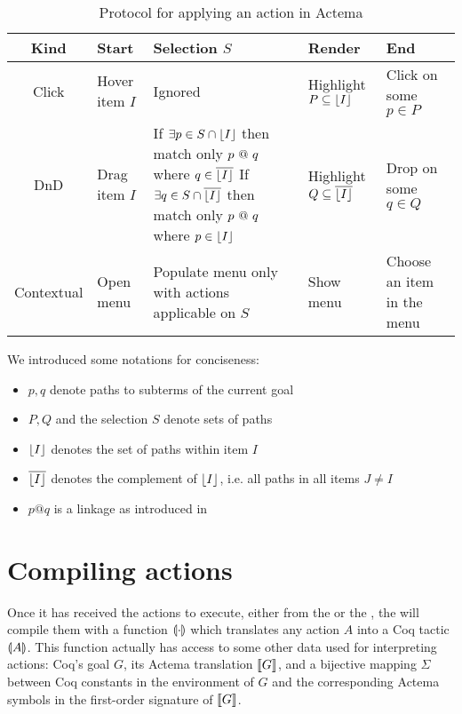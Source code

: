 \begin{table*}[]
  \def\arraystretch{1.5}
  \begin{tabular}{|c|C{0.2\textwidth}|C{0.4\textwidth}|C{0.25\textwidth}|C{0.2\textwidth}|}
  \hline
  \textbf{Kind} & \textbf{Start}       & \textbf{Selection $S$} &
  \textbf{Render}                      & \textbf{End} \\ \hline
  Click         & Hover item $I$       & Ignored & Highlight $P \subseteq
  \lfloor I \rfloor$ & Click on some $p \in P$    \\ \hline
  DnD           & Drag item $I$        &
      If $\exists p \in S \cap \lfloor I \rfloor$ then match only $p \operatorname{\,@\,} q$ where
      $q \in \overline{\lfloor I \rfloor}$
      \newline
      If $\exists q \in S \cap \overline{\lfloor I \rfloor}$ then match only $p
      \operatorname{\,@\,} q$ where $p \in \lfloor I \rfloor$
    & Highlight $Q \subseteq \overline{\lfloor I \rfloor}$ & Drop on some $q \in Q$ \\ \hline
  Contextual    & Open menu & Populate menu only with actions
  applicable on $S$ & Show menu & Choose an item in the menu \\ \hline
  \end{tabular}
  \raggedright
  \parbox{\textwidth}{
    \vspace{1.5em}
    We introduced some notations for conciseness:
    \begin{itemize}
      \item $p, q$ denote paths to subterms of the current goal
      \item $P, Q$ and the selection $S$ denote sets of paths
      \item $\lfloor I \rfloor$ denotes the set of paths within item $I$
      \item $\overline{\lfloor I \rfloor}$ denotes the complement of $\lfloor I \rfloor$, i.e.
      all paths in all items $J \not= I$
      \item $p @ q$ is a linkage as introduced in 
    \end{itemize}}

  \caption{Protocol for applying an action in Actema}
\end{table*}


\section{Compiling actions}

Once it has received the actions to execute, either from the 
or the , the  will compile them with a function
$\llparenthesis \cdot \rrparenthesis$ which translates any action $A$ into a Coq tactic
$\llparenthesis A \rrparenthesis$. This function actually has access to some other data used for
interpreting actions: Coq's goal $G$, its Actema translation $\llbracket G \rrbracket$, and a
bijective mapping $\Sigma$ between Coq constants in the environment of $G$ and
the corresponding Actema symbols in the first-order signature of $\llbracket G \rrbracket$.

